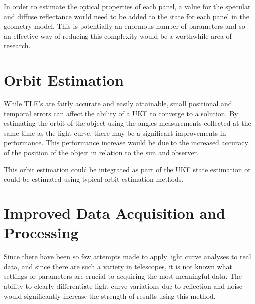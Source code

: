 In order to estimate the optical properties of each panel, a value for the specular and diffuse reflectance would need to be added to the state for each panel in the geometry model. This is potentially an enormous number of parameters and so an effective way of reducing this complexity would be a worthwhile area of research.

\section{Orbit Estimation}

While TLE's are fairly accurate and easily attainable, small positional and temporal errors can affect the ability of a UKF to converge to a solution. By estimating the orbit of the object using the angles measurements collected at the same time as the light curve, there may be a significant improvements in performance. This performance increase would be due to the increased accuracy of the position of the object in relation to the sun and observer.

This orbit estimation could be integrated as part of the UKF state estimation or could be estimated using typical orbit estimation methods.

\section{Improved Data Acquisition and Processing}

Since there have been so few attempts made to apply light curve analyses to real data, and since there are such a variety in telescopes, it is not known what settings or parameters are crucial to acquiring the most meaningful data. The ability to clearly differentiate light curve variations due to reflection and noise would significantly increase the strength of results using this method.
